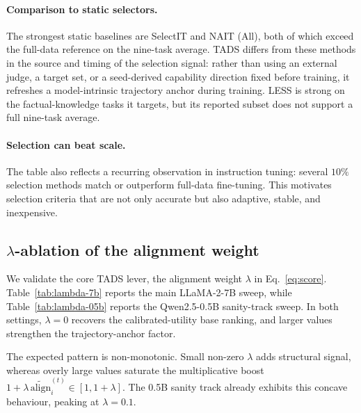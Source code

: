 \paragraph{Comparison to static selectors.}
The strongest static baselines are SelectIT and NAIT (All), both
of which exceed the full-data reference on the nine-task average.
\textsc{TADS} differs from these methods in the source and timing
of the selection signal: rather than using an external judge, a
target set, or a seed-derived capability direction fixed before
training, it refreshes a model-intrinsic trajectory anchor during
training. LESS is strong on the factual-knowledge tasks it
targets, but its reported subset does not support a full nine-task
average.

\paragraph{Selection can beat scale.}
The table also reflects a recurring observation in instruction
tuning: several $10\%$ selection methods match or outperform
full-data fine-tuning. This motivates selection criteria that are
not only accurate but also adaptive, stable, and inexpensive.

\subsection{$\lambda$-ablation of the alignment weight}
\label{sec:lambda-ablation}

We validate the core \textsc{TADS} lever, the alignment weight
$\lambda$ in Eq.~\ref{eq:score}. Table~\ref{tab:lambda-7b} reports
the main LLaMA-2-7B sweep, while Table~\ref{tab:lambda-05b}
reports the Qwen2.5-0.5B sanity-track sweep. In both settings,
$\lambda=0$ recovers the calibrated-utility base ranking, and
larger values strengthen the trajectory-anchor factor.

The expected pattern is non-monotonic. Small non-zero $\lambda$
adds structural signal, whereas overly large values saturate the
multiplicative boost
$1+\lambda\,\widetilde{\mathrm{align}}_i^{(t)} \in [1,1+\lambda]$.
The 0.5B sanity track already exhibits this concave behaviour,
peaking at $\lambda=0.1$.


